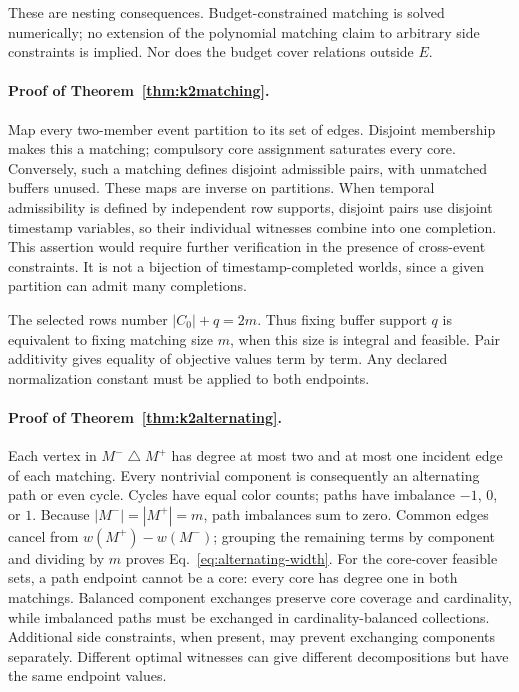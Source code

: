 These are nesting consequences. Budget-constrained matching is solved
numerically; no extension of the polynomial matching claim to arbitrary
side constraints is implied. Nor does the budget cover relations outside $E$.


\paragraph{Proof of Theorem~\ref{thm:k2matching}.}
Map every two-member event partition to its set of edges. Disjoint membership
makes this a matching; compulsory core assignment saturates every core.
Conversely, such a matching defines disjoint admissible pairs, with unmatched
buffers unused. These maps are inverse on partitions. When temporal
admissibility is defined by independent row supports, disjoint pairs use
disjoint timestamp variables, so their individual witnesses combine into one
completion. This assertion would require further verification in the presence
of cross-event constraints. It is not a bijection of timestamp-completed
worlds, since a given partition can admit many completions.

The selected rows number $|C_0|+q=2m$. Thus fixing buffer support $q$ is
equivalent to fixing matching size $m$, when this size is integral and
feasible. Pair additivity gives equality of objective values term by term.
Any declared normalization constant must be applied to both endpoints.

\paragraph{Proof of Theorem~\ref{thm:k2alternating}.}
Each vertex in $M^-\mathbin{\triangle}M^+$ has degree at most two and at most
one incident edge of each matching. Every nontrivial component is consequently
an alternating path or even cycle. Cycles have equal color counts; paths have
imbalance $-1$, $0$, or $1$. Because $|M^-|=|M^+|=m$, path imbalances sum to
zero. Common edges cancel from $w(M^+)-w(M^-)$; grouping the remaining terms by
component and dividing by $m$ proves Eq.~\eqref{eq:alternating-width}.
For the core-cover feasible sets, a path endpoint cannot be a core: every core
has degree one in both matchings. Balanced component exchanges preserve core
coverage and cardinality, while imbalanced paths must be exchanged in
cardinality-balanced collections. Additional side constraints, when present,
may prevent exchanging components separately. Different optimal witnesses can
give different decompositions but have the same endpoint values.

